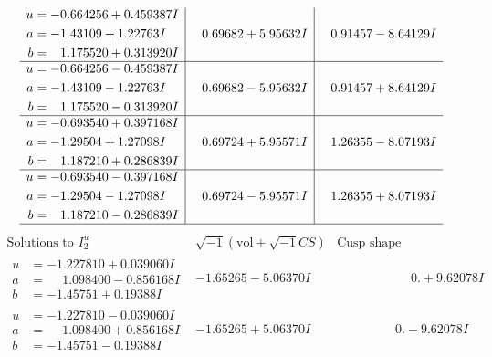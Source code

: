 \documentclass[1p]{elsarticle_modified}
\theoremstyle{definition}
\newcommand{\I}{\sqrt{-1}}
\begin{document}
$$\begin{array}{c|c|c}
\begin{aligned}
u &= -0.664256 + 0.459387 I \\
a &= -1.43109 + 1.22763 I \\
b &= \phantom{-}1.175520 + 0.313920 I\end{aligned}
 & \phantom{-}0.69682 + 5.95632 I & \phantom{-}0.91457 - 8.64129 I \\ \hline\begin{aligned}
u &= -0.664256 - 0.459387 I \\
a &= -1.43109 - 1.22763 I \\
b &= \phantom{-}1.175520 - 0.313920 I\end{aligned}
 & \phantom{-}0.69682 - 5.95632 I & \phantom{-}0.91457 + 8.64129 I \\ \hline\begin{aligned}
u &= -0.693540 + 0.397168 I \\
a &= -1.29504 + 1.27098 I \\
b &= \phantom{-}1.187210 + 0.286839 I\end{aligned}
 & \phantom{-}0.69724 + 5.95571 I & \phantom{-}1.26355 - 8.07193 I \\ \hline\begin{aligned}
u &= -0.693540 - 0.397168 I \\
a &= -1.29504 - 1.27098 I \\
b &= \phantom{-}1.187210 - 0.286839 I\end{aligned}
 & \phantom{-}0.69724 - 5.95571 I & \phantom{-}1.26355 + 8.07193 I\\
 \hline 
 \end{array}$$\newpage$$\begin{array}{c|c|c}  
\text{Solutions to }I^u_{2}& \I (\text{vol} + \sqrt{-1}CS) & \text{Cusp shape}\\
 \hline 
\begin{aligned}
u &= -1.227810 + 0.039060 I \\
a &= \phantom{-}1.098400 - 0.856168 I \\
b &= -1.45751 + 0.19388 I\end{aligned}
 & -1.65265 - 5.06370 I & \phantom{-0.000000 -}0. + 9.62078 I \\ \hline\begin{aligned}
u &= -1.227810 - 0.039060 I \\
a &= \phantom{-}1.098400 + 0.856168 I \\
b &= -1.45751 - 0.19388 I\end{aligned}
 & -1.65265 + 5.06370 I & \phantom{-0.000000 } 0. - 9.62078 I \\ \hline\begin{aligned}

\end{aligned}
\end{array}$$
\end{document}
